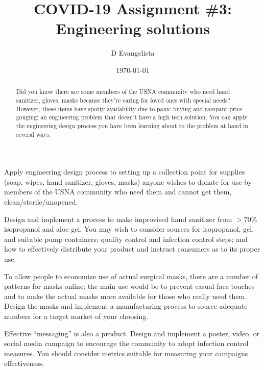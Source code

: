 \documentclass{exam}
\title{COVID-19 Assignment \#3: Engineering solutions}
\author{D Evangelista}
\date{\today}
\begin{document}
\maketitle

\begin{abstract}
Did you know there are some members of the USNA community who need hand sanitizer, gloves, masks because they're caring for loved ones with special needs? However, these items have spotty availability due to panic buying and rampant price gouging: an engineering problem that doesn't have a high tech solution. You can apply the engineering design process you have been learning about to the problem at hand in several ways. 
\end{abstract}

\begin{questions}
\question Apply engineering design process to setting up a collection point for supplies (soap, wipes, hand sanitizer, gloves, masks) anyone wishes to donate for use by members of the USNA community who need them and cannot get them, clean/sterile/unopened. 

\question Design and implement a process to make improvised hand sanitizer from $>70\%$ isopropanol and aloe gel. You may wish to consider sources for isopropanol, gel, and suitable pump containers; quality control and infection control steps; and how to effectively distribute your product and instruct consumers as to its proper use. 

\question To allow people to economize use of actual surgical masks, there are a number of patterns for masks online; the main use would be to prevent casual face touches and to make the actual masks more available for those who really need them. Design the masks and implement a manufacturing process to source adequate numbers for a target market of your choosing. 

\question Effective ``messaging'' is also a product. Design and implement a poster, video, or social media campaign to encourage the community to adopt infection control measures. You should consider metrics suitable for measuring your campaigns effectiveness. 
\end{questions}
\end{document}
